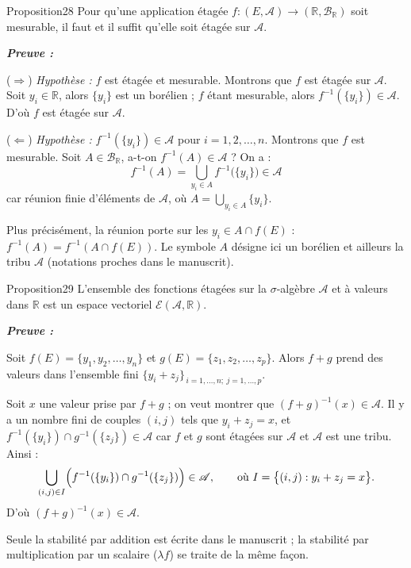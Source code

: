\documentclass[11pt,a4paper]{article}
\newcommand{\R}{\mathbb{R}}
\newcommand{\A}{\mathscr{A}}
\newcommand{\B}{\mathscr{B}}
\newcommand{\Ee}{\mathscr{E}}
\newenvironment{preuve}{\par\textit{\textbf{Preuve :}}\par\nopagebreak[4]}{\par}
\begin{document}
\begin{enonce}{Proposition}{28}
Pour qu'une application étagée $f:(E,\A)\to(\R,\B_{\R})$ soit mesurable,
il faut et il suffit qu'elle soit étagée sur $\A$.
\end{enonce}

\begin{preuve}\end{preuve}

($\Rightarrow$) \textit{Hypothèse :} $f$ est étagée et mesurable. Montrons que $f$ est étagée sur $\A$.
Soit $y_i\in\R$, alors $\{y_i\}$ est un borélien ; $f$ étant mesurable, alors $f^{-1}(\{y_i\})\in\A$.
D'où $f$ est étagée sur $\A$.

($\Leftarrow$) \textit{Hypothèse :} $f^{-1}(\{y_i\})\in\A$ pour $i=1,2,\dots,n$.
Montrons que $f$ est mesurable. Soit $A\in\B_{\R}$, a-t-on $f^{-1}(A)\in\A$ ? On a :
\[
  f^{-1}(A)=\bigcup_{y_i\in A} f^{-1}\bigl(\{y_i\}\bigr)\in\A
\]
car réunion finie d'éléments de $\A$, où $A=\bigcup_{y_i\in A}\{y_i\}$.

\begin{note}
Plus précisément, la réunion porte sur les $y_i\in A\cap f(E)$ : $f^{-1}(A)=f^{-1}(A\cap f(E))$.
Le symbole $A$ désigne ici un borélien et ailleurs la tribu $\A$ (notations proches dans le manuscrit).
\end{note}

\begin{enonce}{Proposition}{29}
L'ensemble des fonctions étagées sur la $\sigma$-algèbre $\A$ et à valeurs dans $\R$
est un espace vectoriel $\Ee(\A,\R)$.
\end{enonce}

\begin{preuve}\end{preuve}

Soit $f(E)=\{y_1,y_2,\dots,y_n\}$ et $g(E)=\{z_1,z_2,\dots,z_p\}$.
Alors $f+g$ prend des valeurs dans l'ensemble fini $\{y_i+z_j\}_{\,i=1,\dots,n;\ j=1,\dots,p}$.

Soit $x$ une valeur prise par $f+g$ ; on veut montrer que $(f+g)^{-1}(x)\in\A$.
Il y a un nombre fini de couples $(i,j)$ tels que $y_i+z_j=x$, et
$f^{-1}(\{y_i\})\cap g^{-1}(\{z_j\})\in\A$ car $f$ et $g$ sont étagées sur $\A$ et $\A$ est une tribu.
Ainsi :
\[
  \bigcup_{(i,j)\in I}\Bigl(f^{-1}(\{y_i\})\cap g^{-1}(\{z_j\})\Bigr)\in\A,
  \qquad\text{où } I=\bigl\{(i,j) : y_i+z_j=x\bigr\}.
\]
D'où $(f+g)^{-1}(x)\in\A$.

\begin{note}
Seule la stabilité par addition est écrite dans le manuscrit ;
la stabilité par multiplication par un scalaire ($\lambda f$) se traite de la même façon.
\end{note}
\end{document}
